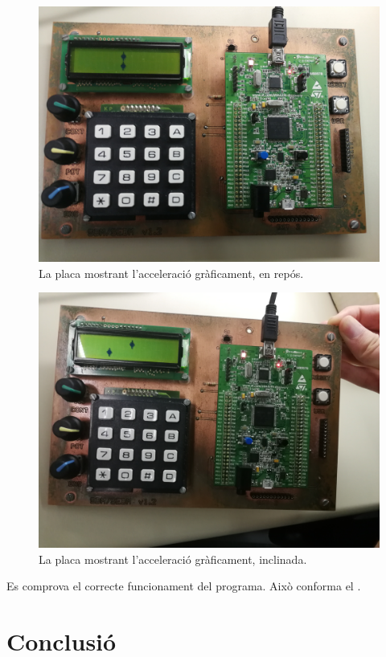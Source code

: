\begin{figure}[p] %
  \begin{center}
    \includegraphics[width=.82\columnwidth]{../photos/board/p3-dots-initial}
  \end{center}
  \caption{ \label{fig:p3-board-dots-initial} La placa mostrant l'acceleració gràficament, en repós. }
\end{figure}
\begin{figure}[p]
  \begin{center}
    \includegraphics[width=.82\columnwidth]{../photos/board/p3-dots-tilt_1}
  \end{center}
  \caption{ \label{fig:p3-board-dots-tilt} La placa mostrant l'acceleració gràficament, inclinada. }
\end{figure}

Es comprova el correcte funcionament del programa. Això conforma el
.


\section{Conclusió}

